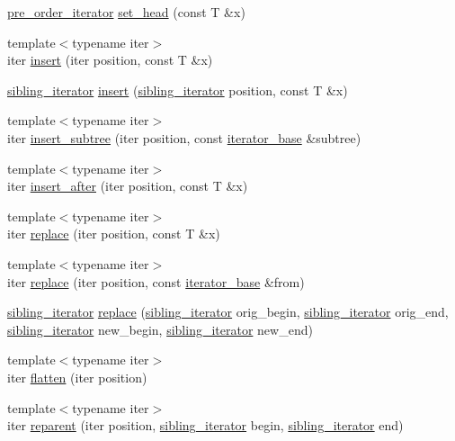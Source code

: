 \begin{CompactItemize}
\hyperlink{classtree_1_1pre__order__iterator}{pre\_\-order\_\-iterator} \hyperlink{classtree_f11d736ea971ab93651350161f5a7535}{set\_\-head} (const T \&x)
\item 
{\footnotesize template$<$typename iter$>$ }\\iter \hyperlink{classtree_c3d19d3a42f91618267674f2c236aad9}{insert} (iter position, const T \&x)
\item 
\hyperlink{classtree_1_1sibling__iterator}{sibling\_\-iterator} \hyperlink{classtree_429bbd485078981ef83b59a779d9f947}{insert} (\hyperlink{classtree_1_1sibling__iterator}{sibling\_\-iterator} position, const T \&x)
\item 
{\footnotesize template$<$typename iter$>$ }\\iter \hyperlink{classtree_d66d55d58b48ce0a8d7a5b41abe923d5}{insert\_\-subtree} (iter position, const \hyperlink{classtree_1_1iterator__base}{iterator\_\-base} \&subtree)
\item 
{\footnotesize template$<$typename iter$>$ }\\iter \hyperlink{classtree_215ab56bd13f59c661eb2298e373ff3e}{insert\_\-after} (iter position, const T \&x)
\item 
{\footnotesize template$<$typename iter$>$ }\\iter \hyperlink{classtree_4885e968c82655ebebea5d0927b7e9f4}{replace} (iter position, const T \&x)
\item 
{\footnotesize template$<$typename iter$>$ }\\iter \hyperlink{classtree_5d2ad4532598f26c84b1ab0ec84a5d62}{replace} (iter position, const \hyperlink{classtree_1_1iterator__base}{iterator\_\-base} \&from)
\item 
\hyperlink{classtree_1_1sibling__iterator}{sibling\_\-iterator} \hyperlink{classtree_fc5bef13996f2fd939d83837aa8e090d}{replace} (\hyperlink{classtree_1_1sibling__iterator}{sibling\_\-iterator} orig\_\-begin, \hyperlink{classtree_1_1sibling__iterator}{sibling\_\-iterator} orig\_\-end, \hyperlink{classtree_1_1sibling__iterator}{sibling\_\-iterator} new\_\-begin, \hyperlink{classtree_1_1sibling__iterator}{sibling\_\-iterator} new\_\-end)
\item 
{\footnotesize template$<$typename iter$>$ }\\iter \hyperlink{classtree_479c8e3f748608a9b9fb91e58e18998c}{flatten} (iter position)
\item 
{\footnotesize template$<$typename iter$>$ }\\iter \hyperlink{classtree_32b88523e2d5b6c78381b7da9455be5e}{reparent} (iter position, \hyperlink{classtree_1_1sibling__iterator}{sibling\_\-iterator} begin, \hyperlink{classtree_1_1sibling__iterator}{sibling\_\-iterator} end)

\end{CompactItemize}
